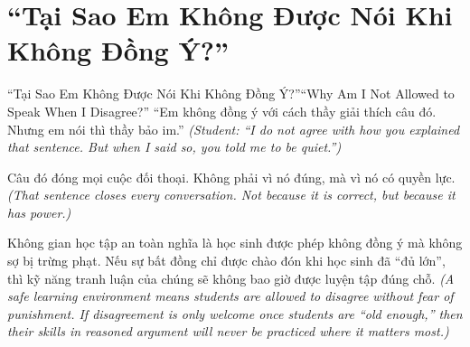 \section{``Tại Sao Em Không Được Nói Khi Không Đồng Ý?''}
\begin{truyen}{``Tại Sao Em Không Được Nói Khi Không Đồng Ý?''}{``Why Am I Not Allowed to Speak When I Disagree?''}
 ``Em không đồng ý với cách thầy giải thích câu đó. Nhưng em nói thì thầy bảo im.''
\textit{(Student: ``I do not agree with how you explained that sentence. But when I said so, you told me to be quiet.'')}




Câu đó đóng mọi cuộc đối thoại. Không phải vì nó đúng, mà vì nó có quyền lực.
\textit{(That sentence closes every conversation. Not because it is correct, but because it has power.)}

\begin{baihoc}
Không gian học tập an toàn nghĩa là học sinh được phép không đồng ý mà không sợ bị trừng phạt. Nếu sự bất đồng chỉ được chào đón khi học sinh đã ``đủ lớn'', thì kỹ năng tranh luận của chúng sẽ không bao giờ được luyện tập đúng chỗ.
\textit{(A safe learning environment means students are allowed to disagree without fear of punishment. If disagreement is only welcome once students are ``old enough,'' then their skills in reasoned argument will never be practiced where it matters most.)}
\end{baihoc}
\end{truyen}

